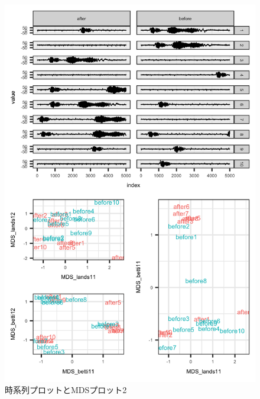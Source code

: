 \documentclass{jarticle}
\begin{document}
\begin{figure}[H]
	\begin{center}
		\includegraphics[width=15cm]{fig/MDS_plot2.png}
		\caption{時系列プロットとMDSプロット2}
		\label{fig:MDS_plot2}
	\end{center}
\end{figure}
\end{document}
